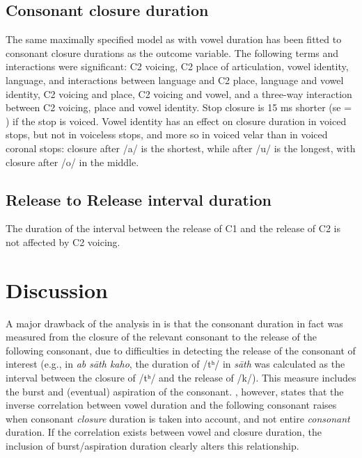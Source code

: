 \documentclass[]{JASAnew}
\begin{document}
\hypertarget{consonant-closure-duration}{%
\subsection{Consonant closure
duration}\label{consonant-closure-duration}}

The same maximally specified model as with vowel duration has been
fitted to consonant closure durations as the outcome variable. The
following terms and interactions were significant: C2 voicing, C2 place
of articulation, vowel identity, language, and interactions between
language and C2 place, language and vowel identity, C2 voicing and
place, C2 voicing and vowel, and a three-way interaction between C2
voicing, place and vowel identity. Stop closure is 15 ms shorter (se = )
if the stop is voiced. Vowel identity has an effect on closure duration
in voiced stops, but not in voiceless stops, and more so in voiced velar
than in voiced coronal stops: closure after /a/ is the shortest, while
after /u/ is the longest, with closure after /o/ in the middle.

\hypertarget{release-to-release-interval-duration}{%
\subsection{Release to Release interval
duration}\label{release-to-release-interval-duration}}

The duration of the interval between the release of C1 and the release
of C2 is not affected by C2 voicing.

\hypertarget{discussion}{%
\section{Discussion}\label{discussion}}

A major drawback of the analysis in \citet{maddieson1976} is that the
consonant duration in fact was measured from the closure of the relevant
consonant to the release of the following consonant, due to difficulties
in detecting the release of the consonant of interest (e.g., in \emph{ab
sāth kaho}, the duration of /tʰ/ in \emph{sāth} was calculated as the
interval between the closure of /tʰ/ and the release of /k/). This
measure includes the burst and (eventual) aspiration of the consonant.
\citet{slis1969a}, however, states that the inverse correlation between
vowel duration and the following consonant raises when consonant
\emph{closure} duration is taken into account, and not entire
\emph{consonant} duration. If the correlation exists between vowel and
closure duration, the inclusion of burst/aspiration duration clearly
alters this relationship.
\end{document}
